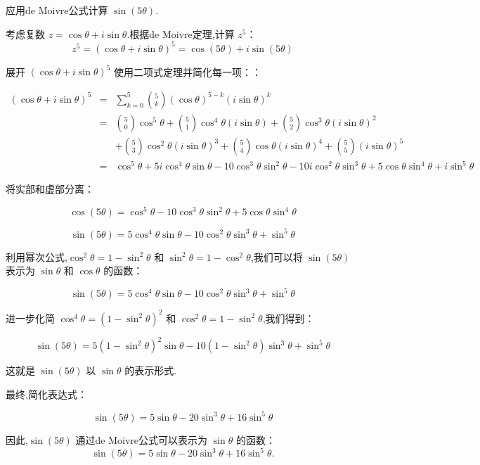 \begin{example}
    应用de Moivre公式计算 $\sin(5\theta)$.
\end{example}
\begin{solution}
    考虑复数 $z = \cos\theta + i\sin\theta$.根据de Moivre定理,计算 $z^5$：
    \[
    z^5 = (\cos\theta + i\sin\theta)^5 = \cos(5\theta) + i\sin(5\theta)
    \]
    
    展开 $(\cos\theta + i\sin\theta)^5$ 使用二项式定理并简化每一项：：
    
    \begin{eqnarray*}
        (\cos\theta + i\sin\theta)^5  &=& \sum_{k=0}^{5} \binom{5}{k} (\cos\theta)^{5-k} (i\sin\theta)^k \\
        &=& \binom{5}{0} \cos^5\theta + \binom{5}{1} \cos^4\theta(i\sin\theta) + \binom{5}{2} \cos^3\theta(i\sin\theta)^2 
        \\
        & & +  \binom{5}{3} \cos^2\theta(i\sin\theta)^3 +  \binom{5}{4} \cos\theta(i\sin\theta)^4 + \binom{5}{5}(i\sin\theta)^5
        \\
        &=&  \cos^5\theta + 5i\cos^4\theta \sin\theta - 10\cos^3\theta \sin^2\theta - 10i\cos^2\theta \sin^3\theta + 5\cos\theta \sin^4\theta + i\sin^5\theta
    \end{eqnarray*}
    

    
    将实部和虚部分离：

    \[
    \cos(5\theta) = \cos^5\theta - 10\cos^3\theta \sin^2\theta + 5\cos\theta \sin^4\theta
    \]
    
    \[
    \sin(5\theta) = 5\cos^4\theta \sin\theta - 10\cos^2\theta \sin^3\theta + \sin^5\theta
    \]
    
    利用幂次公式,$\cos^2\theta = 1 - \sin^2\theta$ 和 $\sin^2\theta = 1 - \cos^2\theta$,我们可以将 $\sin(5\theta)$ 表示为 $\sin\theta$ 和 $\cos\theta$ 的函数：

    \[
    \sin(5\theta) = 5\cos^4\theta \sin\theta - 10\cos^2\theta \sin^3\theta + \sin^5\theta
    \]
    
    进一步化简 $\cos^4\theta = (1 - \sin^2\theta)^2$ 和 $\cos^2\theta = 1 - \sin^2\theta$,我们得到：
    
    \[
    \sin(5\theta) = 5(1 - \sin^2\theta)^2\sin\theta - 10(1 - \sin^2\theta)\sin^3\theta + \sin^5\theta
    \]
    
    这就是 $\sin(5\theta)$ 以 $\sin\theta$ 的表示形式.
    
    最终,简化表达式：
    
    \[
    \sin(5\theta) = 5\sin\theta - 20\sin^3\theta + 16\sin^5\theta
    \]
    
    因此,$\sin(5\theta)$ 通过de Moivre公式可以表示为 $\sin\theta$ 的函数：
    \[
    \sin(5\theta) = 5\sin\theta - 20\sin^3\theta + 16\sin^5\theta.
    \]
    
\end{solution}



